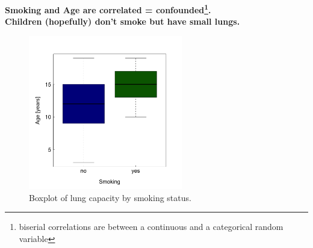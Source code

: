 \documentclass{beamer}
\begin{document}
\begin{frame}
  \frametitle{}
\textbf{Smoking and Age are correlated = confounded\footnote{biserial correlations are between a continuous and a categorical random variable}.\\ Children (hopefully) don't smoke but have small lungs.}
  
  \begin{figure}[h]
    \includegraphics[width=0.6\textwidth]{lectures/day_3_LM_refresh_II/figures/unnamed-chunk-25-1.png} 
    \caption{Boxplot of lung capacity by smoking status.}
  \end{figure}
\end{frame}

\end{document}
